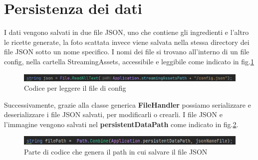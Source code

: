 \section{Persistenza dei dati}
I dati vengono salvati in due file JSON, uno che contiene gli ingredienti e l'altro le ricette generate, la foto scattata invece viene salvata nella stessa directory dei file JSON sotto un nome specifico. I nomi dei file si trovano all'interno di un file config, nella cartella StreamingAssets,  accessibile e leggibile come indicato in fig.\ref{fig:streamingAssets}

\begin{figure}[H]
    \centering
    \includegraphics[width=\textwidth,height=\textheight,keepaspectratio]{figures/chapter_1/streamingAssets_CODICE.png}
    \caption{Codice per leggere il file di config}
    \label{fig:streamingAssets}
\end{figure}

Successivamente, grazie alla classe generica \textbf{FileHandler} possiamo serializzare e deserializzare i file JSON salvati, per modificarli o crearli. 
I file JSON  e l'immagine vengono salvati nel \textbf{persistentDataPath} come indicato in fig.\ref{fig:persistentDataPath}.

\begin{figure}[H]
    \centering
    \includegraphics[width=\textwidth,height=\textheight,keepaspectratio]{figures/chapter_1/persistentDatapath_CODICE.png}
    \caption{Parte di codice che genera il path in cui salvare il file JSON}
    \label{fig:persistentDataPath}
\end{figure}